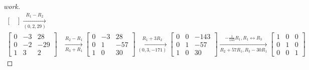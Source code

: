 \documentclass{article}
\begin{document}
\begin{enumerate}
\begin{proof}[work]
\begin{align*}
\begin{bmatrix}
      \end{bmatrix} \xrightarrow[(0,2,29)]{R_1 - R_2}     \\
      \begin{bmatrix}
        0 & -3 & 28  \\
        0 & -2 & -29 \\
        1 & 3  & 2
      \end{bmatrix} & \xrightarrow[R_3 + R_1]{R_2 - R_1}
      \begin{bmatrix}
        0 & -3 & 28  \\
        0 & 1  & -57 \\
        1 & 0  & 30
      \end{bmatrix} \xrightarrow[(0,3,-171)]{R_1 + 3R_2}
      \begin{bmatrix}
        0 & 0 & -143 \\
        0 & 1 & -57  \\
        1 & 0 & 30
      \end{bmatrix} \xrightarrow[R_2+57R_1,R_3-30R_1]{-\frac{1}{143}R_1, R_1 \leftrightarrow R_3}
      \begin{bmatrix}
        1 & 0 & 0 \\
        0 & 1 & 0 \\
        0 & 0 & 1
      \end{bmatrix}
    \end{align*}
  \end{proof}
\end{enumerate}
\end{document}

